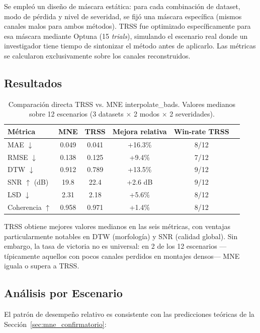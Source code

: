 Se empleó un diseño de máscara estática: para cada combinación de dataset, modo de pérdida y nivel de severidad, se fijó una máscara específica (mismos canales malos para ambos métodos). TRSS fue optimizado específicamente para esa máscara mediante Optuna (15 \textit{trials}), simulando el escenario real donde un investigador tiene tiempo de sintonizar el método antes de aplicarlo. Las métricas se calcularon exclusivamente sobre los canales reconstruidos.

\subsection{Resultados}

\begin{table}[ht]
\centering
\caption{Comparación directa TRSS vs. MNE interpolate\_bads. Valores medianos sobre 12 escenarios (3 datasets $\times$ 2 modos $\times$ 2 severidades).}
\label{tab:mne_vs_trss}
\begin{tabular}{lccccc}
\toprule
\textbf{Métrica} & \textbf{MNE} & \textbf{TRSS} & \textbf{Mejora relativa} & \textbf{Win-rate TRSS} \\
\midrule
MAE $\downarrow$ & 0.049 & 0.041 & +16.3\% & 8/12 \\
RMSE $\downarrow$ & 0.138 & 0.125 & +9.4\% & 7/12 \\
DTW $\downarrow$ & 0.912 & 0.789 & +13.5\% & 9/12 \\
SNR $\uparrow$ (dB) & 19.8 & 22.4 & +2.6 dB & 9/12 \\
LSD $\downarrow$ & 2.31 & 2.18 & +5.6\% & 8/12 \\
Coherencia $\uparrow$ & 0.958 & 0.971 & +1.4\% & 8/12 \\
\bottomrule
\end{tabular}
\end{table}

TRSS obtiene mejores valores medianos en las seis métricas, con ventajas particularmente notables en DTW (morfología) y SNR (calidad global). Sin embargo, la tasa de victoria no es universal: en 2 de los 12 escenarios —típicamente aquellos con pocos canales perdidos en montajes densos— MNE iguala o supera a TRSS.

\subsection{Análisis por Escenario}

El patrón de desempeño relativo es consistente con las predicciones teóricas de la Sección~\ref{sec:mne_confirmatorio}:

